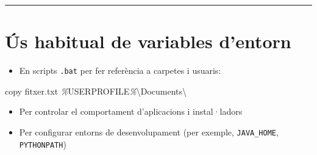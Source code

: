 \documentclass[
  a4paper,
]{article}
\newenvironment{Shaded}{\begin{snugshade}}{\end{snugshade}}
\newcommand{\BuiltInTok}[1]{#1}
\newcommand{\NormalTok}[1]{#1}
\newcommand{\PreprocessorTok}[1]{\textcolor[rgb]{0.56,0.35,0.01}{\textit{#1}}}
\newcommand{\VariableTok}[1]{\textcolor[rgb]{0.00,0.00,0.00}{#1}}
\providecommand{\tightlist}{%
  \setlength{\itemsep}{0pt}\setlength{\parskip}{0pt}}
\begin{document}
\begin{center}\rule{0.5\linewidth}{0.5pt}\end{center}

\section{Ús habitual de variables
d'entorn}\label{uxfas-habitual-de-variables-dentorn}

\begin{itemize}
\tightlist
\item
  En scripts \texttt{.bat} per fer referència a carpetes i usuaris:
\end{itemize}

\begin{Shaded}
\begin{Highlighting}[]
\BuiltInTok{copy}\NormalTok{ fitxer.txt }\PreprocessorTok{\%}\VariableTok{USERPROFILE}\PreprocessorTok{\%}\NormalTok{\textbackslash{}Documents\textbackslash{}}
\end{Highlighting}
\end{Shaded}

\begin{itemize}
\tightlist
\item
  Per controlar el comportament d'aplicacions i instal·ladors
\item
  Per configurar entorns de desenvolupament (per exemple,
  \texttt{JAVA\_HOME}, \texttt{PYTHONPATH})
\end{itemize}
\end{document}
